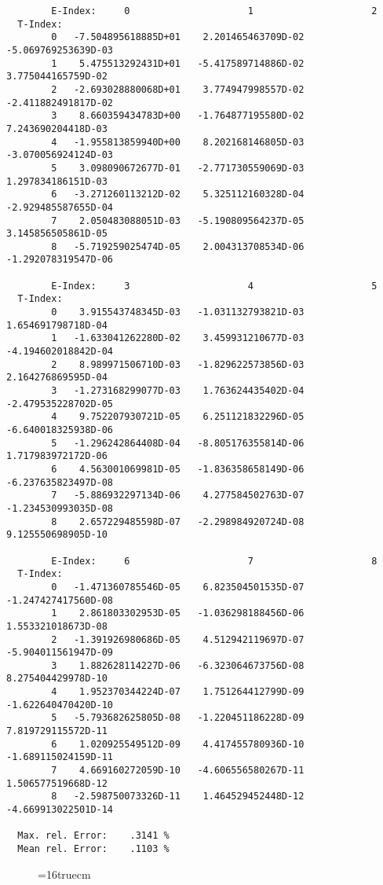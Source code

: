 \documentclass[12pt]{article}
\begin{document}
\begin{small}\begin{verbatim}
        E-Index:     0                     1                     2
  T-Index:
        0   -7.504895618885D+01    2.201465463709D-02   -5.069769253639D-03
        1    5.475513292431D+01   -5.417589714886D-02    3.775044165759D-02
        2   -2.693028880068D+01    3.774947998557D-02   -2.411882491817D-02
        3    8.660359434783D+00   -1.764877195580D-02    7.243690204418D-03
        4   -1.955813859940D+00    8.202168146805D-03   -3.070056924124D-03
        5    3.098090672677D-01   -2.771730559069D-03    1.297834186151D-03
        6   -3.271260113212D-02    5.325112160328D-04   -2.929485587655D-04
        7    2.050483088051D-03   -5.190809564237D-05    3.145856505861D-05
        8   -5.719259025474D-05    2.004313708534D-06   -1.292078319547D-06

        E-Index:     3                     4                     5
  T-Index:
        0    3.915543748345D-03   -1.031132793821D-03    1.654691798718D-04
        1   -1.633041262280D-02    3.459931210677D-03   -4.194602018842D-04
        2    8.989971506710D-03   -1.829622573856D-03    2.164276869595D-04
        3   -1.273168299077D-03    1.763624435402D-04   -2.479535228702D-05
        4    9.752207930721D-05    6.251121832296D-05   -6.640018325938D-06
        5   -1.296242864408D-04   -8.805176355814D-06    1.717983972172D-06
        6    4.563001069981D-05   -1.836358658149D-06   -6.237635823497D-08
        7   -5.886932297134D-06    4.277584502763D-07   -1.234530993035D-08
        8    2.657229485598D-07   -2.298984920724D-08    9.125550698905D-10

        E-Index:     6                     7                     8
  T-Index:
        0   -1.471360785546D-05    6.823504501535D-07   -1.247427417560D-08
        1    2.861803302953D-05   -1.036298188456D-06    1.553321018673D-08
        2   -1.391926980686D-05    4.512942119697D-07   -5.904011561947D-09
        3    1.882628114227D-06   -6.323064673756D-08    8.275404429978D-10
        4    1.952370344224D-07    1.751264412799D-09   -1.622640470420D-10
        5   -5.793682625805D-08   -1.220451186228D-09    7.819729115572D-11
        6    1.020925549512D-09    4.417455780936D-10   -1.689115024159D-11
        7    4.669160272059D-10   -4.606556580267D-11    1.506577519668D-12
        8   -2.598750073326D-11    1.464529452448D-12   -4.669913022501D-14

  Max. rel. Error:    .3141 %
  Mean rel. Error:    .1103 %

\end{verbatim}\end{small}
\begin{figure} \label{2.2C}
\epsfxsize=16truecm
\end{figure}
\newpage
\end{document}

